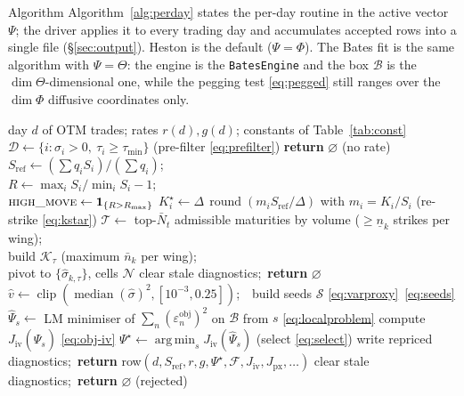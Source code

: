 \documentclass[a4paper, 11pt, reqno]{amsart}
\makeatletter
\def\section{\@startsection{section}{1}%
	\z@{.7\linespacing\@plus\linespacing}{.5\linespacing}%
	{\normalfont\bfseries\centering}}
\DeclareMathOperator*{\argmin}{arg\,min}
\DeclareMathOperator{\round}{round}
\DeclareMathOperator{\med}{median}
\DeclareMathOperator{\clip}{clip}
\newcommand{\ConstMinMaturitySym}{\tau_{\min}}           \newcommand{\ConstMinMaturityVal}{14}
\newcommand{\ConstMaxMoveSym}{R_{\max}}                  \newcommand{\ConstMaxMoveVal}{0.03}
\newcommand{\ConstStrikeGridSym}{\Delta}                 \newcommand{\ConstStrikeGridVal}{5.0}
\newcommand{\ConstMaxMaturitiesSym}{\bar N_t}            \newcommand{\ConstMaxMaturitiesVal}{20}
\newcommand{\ConstMinWingStrikesSym}{\underline{n}_{k}}  \newcommand{\ConstMinWingStrikesVal}{2}
\newcommand{\ConstMaxWingStrikesSym}{\bar{n}_{k}}        \newcommand{\ConstMaxWingStrikesVal}{40}
\newcommand{\ConstIvGateSym}{\varepsilon_{\mathrm{iv}}}  \newcommand{\ConstIvGateVal}{0.02}
\makeatother
\begin{document}
	\section{Algorithm}\label{sec:algorithm}
		Algorithm~\ref{alg:perday} states the per-day routine in the active vector $\Psi$; the driver
		applies it to every trading day and accumulates accepted rows into a single file
		(\S\ref{sec:output}). Heston is the default ($\Psi=\Phi$). The Bates fit is the same algorithm with
		$\Psi=\Theta$: the engine is the \texttt{BatesEngine} and the box $\mathcal{B}$ is the
		$\dim\Theta$-dimensional one, while the pegging test \eqref{eq:pegged} still ranges over the
		$\dim\Phi$ diffusive coordinates only.
		\begin{algorithm}[H]
			\caption{Per-day calibration}\label{alg:perday}
			\begin{algorithmic}[1] %
				\REQUIRE day $d$ of OTM trades; rates $r(d),g(d)$; constants of Table~\ref{tab:const}
				\STATE $\mathcal{D} \leftarrow \{ i : \sigma_i>0,\ \tau_i\ge\ConstMinMaturitySym\}$ \hfill (pre-filter \eqref{eq:prefilter})
				\STATE \textbf{return} $\varnothing$ \hfill (no rate)
				\ENDIF
				\STATE $S_{\mathrm{ref}} \leftarrow (\sum q_i S_i)/(\sum q_i)$; \\
				$R \leftarrow \max_i S_i / \min_i S_i - 1$; \\
				$\textsc{high\_move}\leftarrow \mathbf{1}_{\{R>\ConstMaxMoveSym\}}$
				\STATE $K^\star_i \leftarrow \ConstStrikeGridSym\,\round(m_i S_{\mathrm{ref}}/\ConstStrikeGridSym)$ with $m_i=K_i/S_i$ \hfill (re-strike \eqref{eq:kstar})
				\STATE $\mathcal{T}\leftarrow$ top-$\ConstMaxMaturitiesSym$ admissible maturities by volume ($\ge \ConstMinWingStrikesSym$ strikes per wing); \\
				build $\mathcal{K}_\tau$ (maximum $\ConstMaxWingStrikesSym$ per wing); \\ 
				pivot to $\{\hat\sigma_{k,\tau}\}$, cells $\mathcal{N}$
				\STATE clear stale diagnostics;\ \textbf{return} $\varnothing$
				\ENDIF
				\STATE $\hat v \leftarrow \clip(\med(\hat\sigma)^2,[10^{-3},0.25])$;\ \ build seeds $\mathcal{S}$ \hfill \eqref{eq:varproxy}~\eqref{eq:seeds}
				\STATE $\widehat\Psi_s \leftarrow$ LM minimiser of $\sum_n(\varepsilon^{\mathrm{obj}}_n)^2$ on $\mathcal{B}$ from $s$ \hfill \eqref{eq:localproblem}
				\STATE compute $J_{\mathrm{iv}}(\widehat\Psi_s)$ \hfill \eqref{eq:obj-iv}
				\ENDFOR
				\STATE $\Psi^\star \leftarrow \argmin_{s} J_{\mathrm{iv}}(\widehat\Psi_s)$ \hfill (select \eqref{eq:select})
				\IF{$J_{\mathrm{iv}}(\Psi^\star) \le \ConstIvGateSym$ \AND $\lnot\,\textsc{pegged}(\Psi^\star)$}
				\STATE write repriced diagnostics;\ \textbf{return} row$(d,S_{\mathrm{ref}},r,g,\Psi^\star,\mathcal{F},J_{\mathrm{iv}},J_{\mathrm{px}},\dots)$
				\ELSE
				\STATE clear stale diagnostics;\ \textbf{return} $\varnothing$ \hfill (rejected)
				\ENDIF
			\end{algorithmic}
		\end{algorithm}
	
\end{document}
